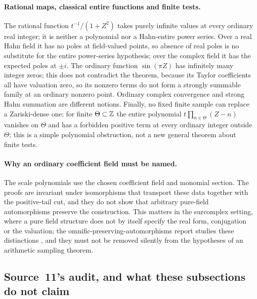 \documentclass[11pt]{article}
\theoremstyle{plain}
\theoremstyle{plain}
\theoremstyle{plain}
\theoremstyle{definition}
\theoremstyle{definition}
\theoremstyle{definition}
\theoremstyle{definition}
\theoremstyle{remark}
\begin{document}
\paragraph{Rational maps, classical entire functions and finite tests.} The
rational function $t^{-1}/(1+Z^2)$ takes purely infinite values at every
ordinary real integer; it is neither a polynomial nor a Hahn-entire power
series. Over a real Hahn field it has no poles at field-valued points, so
absence of real poles is no substitute for the entire power-series hypothesis;
over the complex field it has the expected poles at $\pm i$. The ordinary
function $\sin(\pi Z)$ has infinitely many integer zeros; this does not
contradict the theorem, because its Taylor coefficients all have valuation
zero, so its nonzero terms do not form a strongly summable family at an
ordinary nonzero point. Ordinary complex convergence and strong Hahn summation
are different notions. Finally, no fixed finite sample can replace a
Zariski-dense one: for finite $\Theta\subset\mathbb Z$ the entire polynomial
$t\prod_{n\in\Theta}(Z-n)$ vanishes on $\Theta$ and has a forbidden positive
term at every ordinary integer outside $\Theta$; this is a simple polynomial
obstruction, not a new general theorem about finite tests.

\paragraph{Why an ordinary coefficient field must be named.} The scale
polynomials use the chosen coefficient field and monomial section. The proofs
are invariant under isomorphisms that transport these data together with the
positive-tail cut, and they do not show that arbitrary pure-field automorphisms
preserve the construction. This matters in the surcomplex setting, where a
pure field structure does not by itself specify the real form, conjugation or
the valuation; the omnific-preserving-automorphisms report studies these
distinctions \cite{RepoOPA}, and they must not be removed silently from the
hypotheses of an arithmetic sampling theorem.

\subsection{Source~11's audit, and what these subsections do not claim}
\label{ent:as:subsec:limits}
\end{document}

